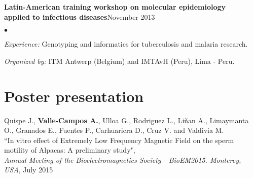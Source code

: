 \documentclass[margin,line]{res}
\newenvironment{list2}{
  \begin{list}{$\bullet$}{%
      \setlength{\itemsep}{0in}
      \setlength{\parsep}{0in} \setlength{\parskip}{0in}
      \setlength{\topsep}{0in} \setlength{\partopsep}{0in}
      \setlength{\leftmargin}{0.2in}}}{\end{list}}
\begin{document}
\begin{resume}


{\bf Latin-American training workshop on molecular epidemiology \\applied to infectious diseases}\hfill {November 2013}\\
	\vspace*{-.1in}%
\begin{list2} %
	\item \textit{Experience:} Genotyping and informatics for tuberculosis and malaria research. %
	\item \textit{Organized by:} ITM Antwerp (Belgium) and IMTAvH (Peru), Lima - Peru.\\
\end{list2}



\section{\sc Poster presentation}

Quispe J., \textbf{Valle-Campos A.}, Ulloa G., Rodriguez L., Liñan A., Limaymanta O., Granados E., Fuentes P., Carhuaricra D., Cruz V. and Valdivia M.\\ ``In vitro effect of Extremely Low Frequency Magnetic Field on the sperm motility of Alpacas: A preliminary study", \\ {\em Annual Meeting of the Bioelectromagnetics Society - BioEM2015. Monterey, USA}, July 2015\\





\end{resume}
\end{document}
